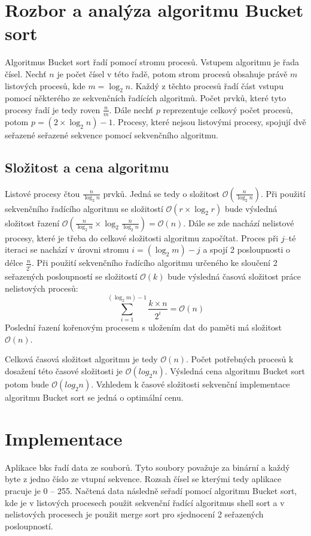 \documentclass[11pt,a4paper,titlepage]{article}
\begin{document}
    \section{Rozbor a analýza algoritmu Bucket sort}
        Algoritmus Bucket sort řadí pomocí stromu procesů. Vstupem algoritmu je řada čísel.
        Nechť $n$ je počet čísel v této řadě, potom strom procesů obsahuje právě $m$ listových
        procesů, kde $m = \log_2 n$. Každý z těchto procesů řadí část vstupu pomocí některého
        ze sekvenčních řadících algoritmů. Počet prvků, které tyto procesy řadí je tedy roven $\frac{n}{m}$.
        Dále nechť $p$ reprezentuje celkový počet procesů, potom $p = (2 \times \log_2 n) - 1$.
        Procesy, které nejsou listovými procesy, spojují dvě seřazené seřazené sekvence pomocí
        sekvenčního algoritmu.
        
        \subsection{Složitost a cena algoritmu}
        Listové procesy čtou $\frac{n}{\log_2 n}$ prvků. Jedná se tedy o složitost $\mathcal{O}(\frac{n}{\log_2 n})$.
        Při použití sekvenčního řadícího algoritmu se složitostí $\mathcal{O}(r \times \log_2 r )$ bude výsledná složitost
        řazení $\mathcal{O}(\frac{n}{\log_2 n} \times \log_2 \frac{n}{\log_2 n}) = \mathcal{O}(n)$. Dále se zde nachází
        nelistové procesy, které je třeba do celkové složitosti algoritmu započítat. Proces při $j$--té iteraci se nachází
        v úrovni stromu $i = (\log_2 m) - j$ a spojí 2 posloupnosti o délce $\frac{n}{2^i}$. Při použití sekvenčního řadícího
        algoritmu určeného ke sloučení 2 seřazených posloupností se složitostí $\mathcal{O}(k)$ bude výsledná časová složitost
        práce nelistových procesů:
        $$\sum_{i=1}^{(\log_2 m) - 1} \frac{k \times n}{2^i} = \mathcal{O}(n)$$
        Poslední řazení kořenovým procesem s uložením dat do paměti má složitost $\mathcal{O}(n)$.
        
        Celková časová složitost algoritmu je tedy $\mathcal{O}(n)$. Počet potřebných procesů k dosažení této
        časové složitosti je $\mathcal{O}(log_2 n)$. Výsledná cena algoritmu Bucket sort potom bude $\mathcal{O}(log_2 n)$.
        Vzhledem k časové složitosti sekvenční implementace algoritmu Bucket sort se jedná o optimální cenu.

	\section{Implementace}
        Aplikace bks řadí data ze souborů. Tyto soubory považuje za binární a každý byte z jedno číslo ze vtupní sekvence.
        Rozsah čísel se kterými tedy aplikace pracuje je 0 -- 255. Načtená data následně seřadí pomocí algoritmu Bucket sort,
        kde je v listových procesech použit sekvenční řadící algoritmus shell sort a v nelistových procesech je použit
        merge sort pro sjednocení 2 seřazených posloupností.
        
\end{document}
